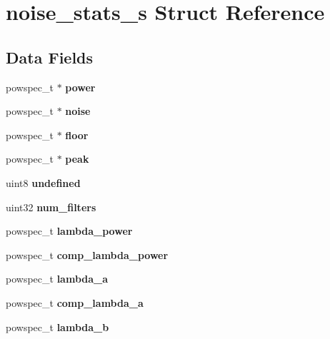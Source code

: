 \section{noise\+\_\+stats\+\_\+s Struct Reference}
\label{structnoise__stats__s}
\subsection*{Data Fields}
\begin{DoxyCompactItemize}
\item 
powspec\+\_\+t $\ast$ {\bfseries power}\label{structnoise__stats__s_a3352c66489d54b578e5f43cc646951dc}

\item 
powspec\+\_\+t $\ast$ {\bfseries noise}\label{structnoise__stats__s_ab21b71b8202302859b120b08b42bb4bb}

\item 
powspec\+\_\+t $\ast$ {\bfseries floor}\label{structnoise__stats__s_aea4aaa0528b85a2989743afee3f21964}

\item 
powspec\+\_\+t $\ast$ {\bfseries peak}\label{structnoise__stats__s_a36e6b3a83014d30755b763fa8575a35d}

\item 
uint8 {\bfseries undefined}\label{structnoise__stats__s_a84138e0f5dd6bc3c8049cce8ea815678}

\item 
uint32 {\bfseries num\+\_\+filters}\label{structnoise__stats__s_ad5b17abb96cc825153b41f1506018c3c}

\item 
powspec\+\_\+t {\bfseries lambda\+\_\+power}\label{structnoise__stats__s_aae414a12fd0b4b8be3a61468fe15f3de}

\item 
powspec\+\_\+t {\bfseries comp\+\_\+lambda\+\_\+power}\label{structnoise__stats__s_a7d2228c947b372142346861adbf16acb}

\item 
powspec\+\_\+t {\bfseries lambda\+\_\+a}\label{structnoise__stats__s_a804b3c775a7d80c95a2a53e9eb0d6b3a}

\item 
powspec\+\_\+t {\bfseries comp\+\_\+lambda\+\_\+a}\label{structnoise__stats__s_a047be8fb044da7e3a3f45b78e9d5de23}

\item 
powspec\+\_\+t {\bfseries lambda\+\_\+b}\label{structnoise__stats__s_a56527a4cfd15aac96133ed20989c89c7}


\end{DoxyCompactItemize}
